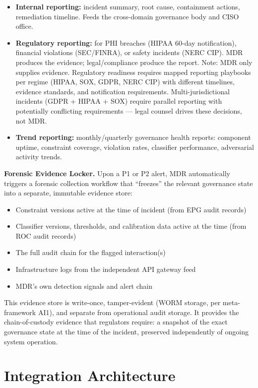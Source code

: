 \begin{itemize}
  \item \textbf{Internal reporting:} incident summary, root cause, containment actions, remediation timeline. Feeds the cross-domain governance body and CISO office.
  \item \textbf{Regulatory reporting:} for PHI breaches (HIPAA 60-day notification), financial violations (SEC/FINRA), or safety incidents (NERC CIP). MDR produces the evidence; legal/compliance produce the report. Note: MDR only supplies evidence. Regulatory readiness requires mapped reporting playbooks per regime (HIPAA, SOX, GDPR, NERC CIP) with different timelines, evidence standards, and notification requirements. Multi-jurisdictional incidents (GDPR + HIPAA + SOX) require parallel reporting with potentially conflicting requirements --- legal counsel drives these decisions, not MDR.
  \item \textbf{Trend reporting:} monthly/quarterly governance health reports: component uptime, constraint coverage, violation rates, classifier performance, adversarial activity trends.
\end{itemize}


\textbf{Forensic Evidence Locker.} Upon a P1 or P2 alert, MDR automatically triggers a forensic collection workflow that ``freezes'' the relevant governance state into a separate, immutable evidence store:

\begin{itemize}
  \item Constraint versions active at the time of incident (from EPG audit records)
  \item Classifier versions, thresholds, and calibration data active at the time (from ROC audit records)
  \item The full audit chain for the flagged interaction(s)
  \item Infrastructure logs from the independent API gateway feed
  \item MDR's own detection signals and alert chain
\end{itemize}


This evidence store is write-once, tamper-evident (WORM storage, per meta-framework AI1), and separate from operational audit storage. It provides the chain-of-custody evidence that regulators require: a snapshot of the exact governance state at the time of the incident, preserved independently of ongoing system operation.



\section{Integration Architecture}
\label{sec:monitoring-6}


